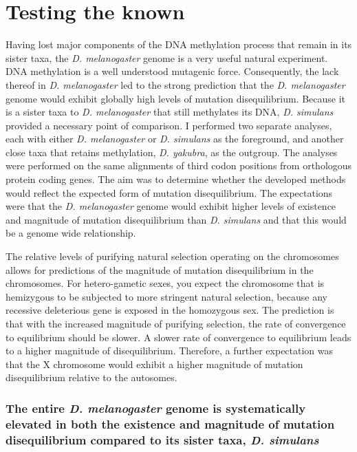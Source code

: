 

\section*{Testing the known}

Having lost major components of the DNA methylation process that remain in its sister taxa, the \textit{D. melanogaster} genome is a very useful natural experiment. DNA methylation is a well understood mutagenic force. Consequently, the lack thereof in
\textit{D. melanogaster} led to the strong prediction that the \textit{D. melanogaster} genome would exhibit globally high levels of mutation disequilibrium. Because it is a sister taxa to \textit{D. melanogaster} that still methylates its DNA, \textit{D. simulans} provided a necessary point of comparison. I performed two separate analyses, each with either \textit{D. melanogaster} or \textit{D. simulans} as the foreground, and another close taxa that retains methylation, \textit{D. yakubra}, as the outgroup. The analyses were performed on the same alignments of third codon positions from orthologous protein coding genes. The aim was to determine whether the developed methods would reflect the expected form of mutation disequilibrium. The expectations were that the \textit{D. melanogaster} genome would exhibit higher levels of existence and magnitude of mutation disequilibrium than \textit{D. simulans} and that this would be a genome wide relationship. 

The relative levels of purifying natural selection operating on the chromosomes allows for predictions of the magnitude of mutation disequilibrium in the chromosomes. For hetero-gametic sexes, you expect the chromosome that is hemizygous to be subjected to more stringent natural selection, because any recessive deleterious gene is exposed in the homozygous sex. The prediction is that with the increased magnitude of purifying selection, the rate of convergence to equilibrium should be slower. A slower rate of convergence to equilibrium leads to a higher magnitude of disequilibrium. Therefore, a further expectation was that the X chromosome would exhibit a higher magnitude of mutation disequilibrium relative to the autosomes. 

\subsubsection*{The entire \textit{D. melanogaster} genome is systematically elevated in both the existence and magnitude of mutation disequilibrium compared to its sister taxa, \textit{D. simulans}}

